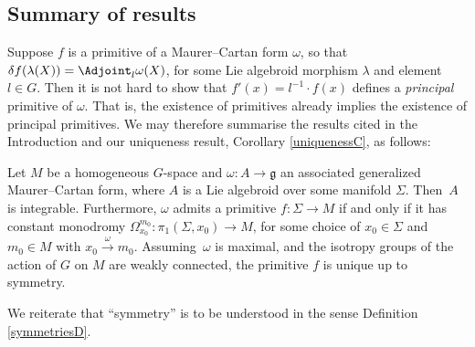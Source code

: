 \subsection*{Summary of results}

Suppose $f$ is a primitive of a Maurer--Cartan form $\omega $, so that
$\delta f (\lambda(X))=\Adjoint_l \omega(X)$, for some Lie algebroid
morphism $\lambda $ and element $l \in G$. Then it is not hard to show
that $f'(x)=l^{-1} \cdot f(x)$ defines a {\em principal} primitive of
$\omega $. That is, the existence of primitives already implies the
existence of principal primitives. We may therefore summarise the
results cited in the Introduction and our uniqueness result, Corollary
\ref{uniquenessC}, as follows:

\begin{Theorem}\label{summaryT}
 Let $M$ be a homogeneous $G$-space and
 $\omega \colon A \rightarrow {\mathfrak g} $ an associated
 generalized Maurer--Cartan form, where $A$ is a Lie algebroid over
 some manifold $\Sigma $. Then~$A$ is integrable. Furthermore,
 $\omega $ admits a primitive $f \colon \Sigma \rightarrow M$ if and
 only if it has constant monodromy
 $\Omega_{x_0}^{m_0} \colon \pi_1(\Sigma, x_0) \rightarrow M$, for
 some choice of $x_0 \in \Sigma $ and $m_0 \in M$ with
 $x_0\xrightarrow{\omega}m_0$. Assu\-ming~$\omega $ is maximal, and the isotropy groups of the action of $G$ on $M$ are weakly
 connected, the primitive $f$ is unique up to symmetry.
\end{Theorem}

We reiterate that ``symmetry'' is to be understood in the sense Definition \ref{symmetriesD}.

